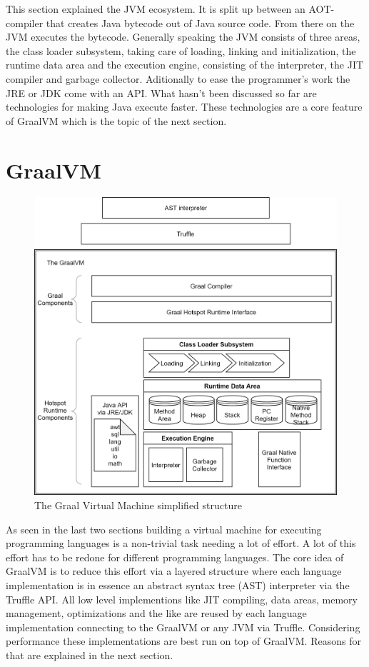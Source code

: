 This section explained the JVM ecosystem. It is split up between an AOT-compiler that creates Java bytecode out of Java source code. From there on the JVM executes the bytecode. Generally speaking the JVM consists of three areas, the class loader subsystem, taking care of loading, linking and initialization, the runtime data area and the execution engine, consisting of the interpreter, the JIT compiler and garbage collector. Aditionally to ease the programmer's work the JRE or JDK come with an API. What hasn't been discussed so far are technologies for making Java execute faster. These technologies are a core feature of GraalVM which is the topic of the next section.
\section{GraalVM}
\begin{figure}
	\includegraphics[scale=0.2]{../figures/GraalVM.png}
	\caption{The Graal Virtual Machine simplified structure}
	\label{fig:graalvm}
\end{figure}
As seen in the last two sections building a virtual machine for executing programming languages is a non-trivial task needing a lot of effort. A lot of this effort has to be redone for different programming languages. The core idea of GraalVM is to reduce this effort via a layered structure where each language implementation is in essence an abstract syntax tree (AST) interpreter via the Truffle API. All low level implementions like JIT compiling, data areas, memory management, optimizations and the like are reused by each language implementation connecting to the GraalVM or any JVM via Truffle. Considering performance these implementations are best run on top of GraalVM. Reasons for that are explained in the next section.\\
